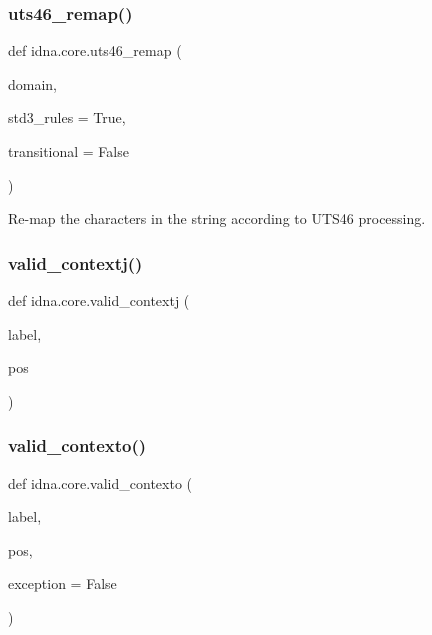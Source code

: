 \subsubsection{\texorpdfstring{uts46\+\_\+remap()}{uts46\_remap()}}
{\footnotesize\ttfamily def idna.\+core.\+uts46\+\_\+remap (\begin{DoxyParamCaption}\item[{}]{domain,  }\item[{}]{std3\+\_\+rules = {\ttfamily True},  }\item[{}]{transitional = {\ttfamily False} }\end{DoxyParamCaption})}

\begin{DoxyVerb}Re-map the characters in the string according to UTS46 processing.\end{DoxyVerb}
 \mbox{\label{namespaceidna_1_1core_ae7d843c0a918b6870e9c42a51ed7c805}} 
\subsubsection{\texorpdfstring{valid\+\_\+contextj()}{valid\_contextj()}}
{\footnotesize\ttfamily def idna.\+core.\+valid\+\_\+contextj (\begin{DoxyParamCaption}\item[{}]{label,  }\item[{}]{pos }\end{DoxyParamCaption})}

\mbox{\label{namespaceidna_1_1core_a359875d6c190a0bb0aebd3d515f55ee1}} 
\subsubsection{\texorpdfstring{valid\+\_\+contexto()}{valid\_contexto()}}
{\footnotesize\ttfamily def idna.\+core.\+valid\+\_\+contexto (\begin{DoxyParamCaption}\item[{}]{label,  }\item[{}]{pos,  }\item[{}]{exception = {\ttfamily False} }\end{DoxyParamCaption})}


